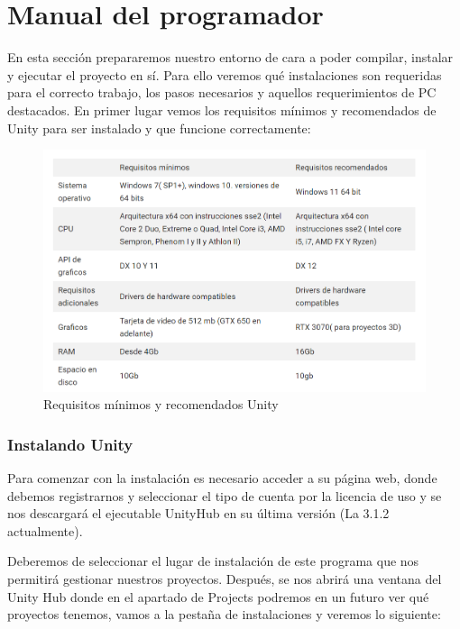 \newpage
\section{Manual del programador}
En esta sección prepararemos nuestro entorno de cara a poder compilar, instalar y ejecutar el proyecto en sí. Para ello veremos qué instalaciones son requeridas para el correcto trabajo, los pasos necesarios y aquellos requerimientos de PC destacados. 
En primer lugar vemos los requisitos mínimos y recomendados de Unity para ser instalado y que funcione correctamente:

\begin{figure}[h]
\centering
\label{Requisitos mínimos y recomendados Unity}
\includegraphics[width=\textwidth]{img/unity req.PNG}
\caption{Requisitos mínimos y recomendados Unity \cite{Requerimientos}}
\end{figure}

\subsubsection{Instalando Unity}
Para comenzar con la instalación es necesario acceder a su página web, donde debemos registrarnos y seleccionar el tipo de cuenta por la licencia de uso y se nos descargará el ejecutable UnityHub en su última versión (La 3.1.2 actualmente).

Deberemos de seleccionar el lugar de instalación de este programa que nos permitirá gestionar nuestros proyectos.
Después, se nos abrirá una ventana del Unity Hub donde en el apartado de Projects podremos en un futuro ver qué proyectos tenemos, vamos a la pestaña de instalaciones y veremos lo siguiente:

